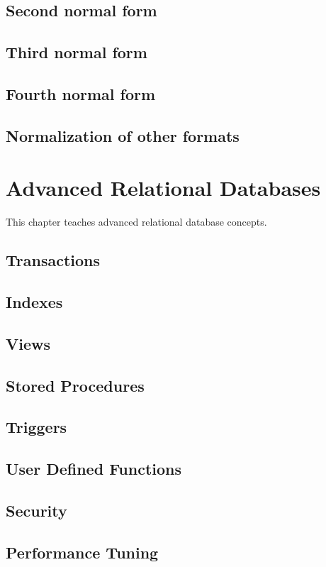 \section{Second normal form}
\section{Third normal form}
\section{Fourth normal form}
\section{Normalization of other formats}

\chapter{Advanced Relational Databases}
\label{chap:relational:advanced-relational-databases}
This chapter teaches advanced relational database concepts.

\section{Transactions}
\section{Indexes}
\section{Views}
\section{Stored Procedures}
\section{Triggers}
\section{User Defined Functions}
\section{Security}
\section{Performance Tuning}


